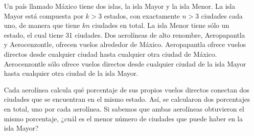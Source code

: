 Un país llamado Máxico tiene dos islas, la isla Mayor y la isla Menor. La isla Mayor está compuesta por $k > 3$ estados, con exactamente $n > 3$ ciudades cada uno, de manera que tiene $kn$ ciudades en total. La isla Menor tiene sólo un estado, el cual tiene 31 ciudades. Dos aerolíneas de alto renombre, Aeropapantla y Aerocenzontle, ofrecen vuelos alrededor de Máxico. Aeropapantla ofrece vuelos directos desde cualquier ciudad hasta cualquier otra ciudad de Máxico. Aerocenzontle sólo ofrece vuelos directos desde cualquier ciudad de la isla Mayor hasta cualquier otra ciudad de la isla Mayor.\newline

Cada aerolínea calcula qué porcentaje de sus propios vuelos directos conectan dos ciudades que se encuentran en el mismo estado. Así, se calcularon dos porcentajes en total, uno por cada aerolínea. Si sabemos que ambas aerolíneas obtuvieron el mismo porcentaje, ¿cuál es el menor número de ciudades que puede haber en la isla Mayor?